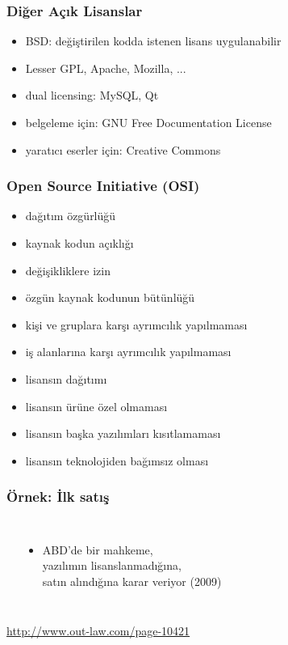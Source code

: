 \documentclass[dvipsnames]{beamer}
\theoremstyle{definition}
\theoremstyle{example}
\theoremstyle{plain}
\begin{document}
\begin{frame}
  \frametitle{Diğer Açık Lisanslar}

  \begin{itemize}
    \item BSD: değiştirilen kodda istenen lisans uygulanabilir
    \item Lesser GPL, Apache, Mozilla, ...
    \item dual licensing: MySQL, Qt

    \pause
    \medskip
    \item belgeleme için: GNU Free Documentation License
    \item yaratıcı eserler için: Creative Commons
  \end{itemize}
\end{frame}

\begin{frame}
  \frametitle{Open Source Initiative (OSI)}

  \begin{itemize}
    \item dağıtım özgürlüğü
    \item kaynak kodun açıklığı
    \item değişikliklere izin
    \item özgün kaynak kodunun bütünlüğü
    \item kişi ve gruplara karşı ayrımcılık yapılmaması
    \item iş alanlarına karşı ayrımcılık yapılmaması
    \item lisansın dağıtımı
    \item lisansın ürüne özel olmaması
    \item lisansın başka yazılımları kısıtlamaması
    \item lisansın teknolojiden bağımsız olması
  \end{itemize}
\end{frame}

\begin{frame}
  \frametitle{Örnek: İlk satış}

  \begin{columns}
    \begin{center}
    \end{center}

    \begin{itemize}
      \item ABD'de bir mahkeme,\\
        yazılımın lisanslanmadığına,\\
        satın alındığına karar veriyor (2009)
    \end{itemize}
  \end{columns}

  \medskip
  \tiny{\url{http://www.out-law.com/page-10421}}\\
\end{frame}
\end{document}
